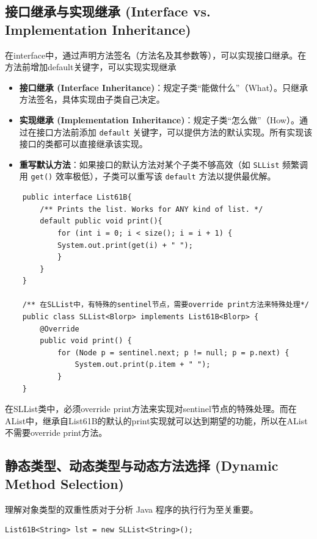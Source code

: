 \documentclass[12pt, a4paper, openany]{ctexbook} %
\begin{document}
\subsection{接口继承与实现继承 (Interface vs. Implementation Inheritance)}
在interface中，通过声明方法签名（方法名及其参数等），可以实现接口继承。在方法前增加default关键字，可以实现实现继承

\begin{itemize}
    \item \textbf{接口继承 (Interface Inheritance)}：规定子类“能做什么”（What）。只继承方法签名，具体实现由子类自己决定。
    \item \textbf{实现继承 (Implementation Inheritance)}：规定子类“怎么做”（How）。通过在接口方法前添加 \texttt{default} 关键字，可以提供方法的默认实现。所有实现该接口的类都可以直接继承该实现。
    \item \textbf{重写默认方法}：如果接口的默认方法对某个子类不够高效（如 \texttt{SLList} 频繁调用 \texttt{get()} 效率极低），子类可以重写该 \texttt{default} 方法以提供最优解。
\end{itemize}

\begin{lstlisting}
    public interface List61B{
        /** Prints the list. Works for ANY kind of list. */
        default public void print(){
            for (int i = 0; i < size(); i = i + 1) {
            System.out.print(get(i) + " ");
            }
        }
    }

    /** 在SLList中，有特殊的sentinel节点，需要override print方法来特殊处理*/
    public class SLList<Blorp> implements List61B<Blorp> {
        @Override
    	public void print() {
    		for (Node p = sentinel.next; p != null; p = p.next) {
    			System.out.print(p.item + " ");
    		}
    }
\end{lstlisting}
\par
在SLList类中，必须override print方法来实现对sentinel节点的特殊处理。而在AList中，继承自List61B的默认的print实现就可以达到期望的功能，所以在AList不需要override print方法。

\subsection{静态类型、动态类型与动态方法选择 (Dynamic Method Selection)}
理解对象类型的双重性质对于分析 Java 程序的执行行为至关重要。

\begin{lstlisting}
List61B<String> lst = new SLList<String>();
\end{lstlisting}
\end{document}
